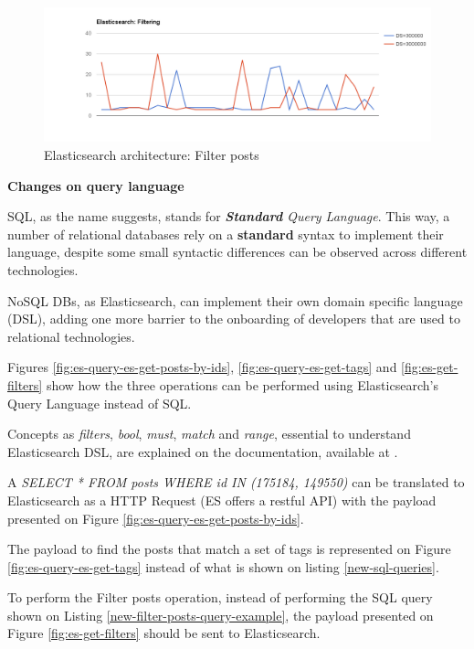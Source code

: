 \begin{figure}[ht!]
	\centering
	\includegraphics[width=150mm]{Imagens/es-filters.png}
	\caption{Elasticsearch architecture: Filter posts \label{fig:es-filters}}
\end{figure}

\noindent \textbf{Changes on query language}

SQL, as the name suggests, stands for \textit{\textbf{Standard} Query Language}. This way, a number of relational databases rely on a \textbf{standard} syntax to implement their language, despite some small syntactic differences can be observed across different technologies.

NoSQL DBs, as Elasticsearch, can implement their own domain specific language (DSL), adding one more barrier to the onboarding of developers that are used to relational technologies. 

Figures \ref{fig:es-query-es-get-posts-by-ids}, \ref{fig:es-query-es-get-tags} and \ref{fig:es-get-filters} show how the three operations can be performed using Elasticsearch's Query Language instead of SQL.

Concepts as \textit{filters}, \textit{bool}, \textit{must}, \textit{match} and \textit{range}, essential to understand Elasticsearch DSL, are explained on the documentation, available at \cite{elasticfilters}.

A \textit{SELECT * FROM posts WHERE id IN (175184, 149550)} can be translated to Elasticsearch as a HTTP Request (ES offers a restful API) with the payload presented on Figure \ref{fig:es-query-es-get-posts-by-ids}. 

The payload to find the posts that match a set of tags is represented on Figure \ref{fig:es-query-es-get-tags} instead of what is shown on listing \ref{new-sql-queries}.

To perform the Filter posts operation, instead of performing the SQL query shown on Listing \ref{new-filter-posts-query-example}, the payload presented on Figure \ref{fig:es-get-filters} should be sent to Elasticsearch. 

